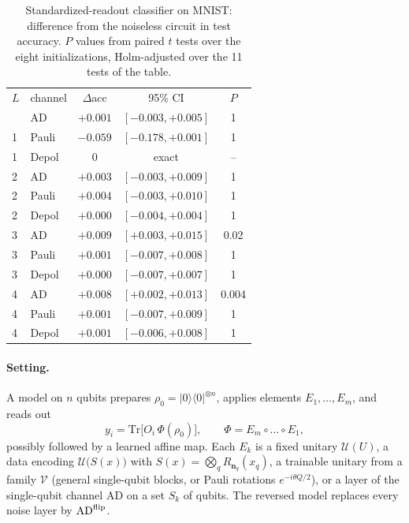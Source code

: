 \documentclass[
 aps,pra,
 twocolumn,
 superscriptaddress,
 longbibliography,
 nofootinbib
]{revtex4-2}
\newcommand{\Tr}{\mathrm{Tr}}
\providecommand{\ket}[1]{\lvert #1 \rangle}
\providecommand{\bra}[1]{\langle #1 \rvert}
\newcommand{\AD}{\mathrm{AD}}
\begin{document}
\begin{table}[t]
\caption{Standardized-readout classifier on MNIST: difference from the
noiseless circuit in test accuracy. $P$ values from paired $t$ tests over the
eight initializations, Holm-adjusted over the 11 tests of the table.}
\label{tab:stats}
\begin{ruledtabular}
\begin{tabular}{llccc}
$L$ & channel & $\Delta$acc & 95\% CI & $P$\\
\colrule
1 & AD & $+0.001$ & $[-0.003,+0.005]$ & 1\\
1 & Pauli & $-0.059$ & $[-0.178,+0.001]$ & 1\\
1 & Depol & $0$ & exact & --\\
2 & AD & $+0.003$ & $[-0.003,+0.009]$ & 1\\
2 & Pauli & $+0.004$ & $[-0.003,+0.010]$ & 1\\
2 & Depol & $+0.000$ & $[-0.004,+0.004]$ & 1\\
3 & AD & $+0.009$ & $[+0.003,+0.015]$ & 0.02\\
3 & Pauli & $+0.001$ & $[-0.007,+0.008]$ & 1\\
3 & Depol & $+0.000$ & $[-0.007,+0.007]$ & 1\\
4 & AD & $+0.008$ & $[+0.002,+0.013]$ & 0.004\\
4 & Pauli & $+0.001$ & $[-0.007,+0.009]$ & 1\\
4 & Depol & $+0.001$ & $[-0.006,+0.008]$ & 1\\
\end{tabular}
\end{ruledtabular}
\end{table}

\paragraph{Setting.}
A model on $n$ qubits prepares $\rho_0=\ket{0}\bra{0}^{\otimes n}$, applies elements
$E_1,\dots,E_m$, and reads out
\begin{equation}
y_i=\Tr\bigl[O_i\,\Phi(\rho_0)\bigr],\qquad \Phi=E_m\circ\dots\circ E_1 ,
\label{eq:app_model}
\end{equation}
possibly followed by a learned affine map. Each $E_k$ is a fixed unitary $\mathcal U(U)$, a data encoding
$\mathcal U\bigl(S(x)\bigr)$ with $S(x)=\bigotimes_q R_{\mathbf n_q}(x_q)$, a trainable unitary from a
family $\mathcal V$ (general single-qubit blocks, or Pauli rotations $e^{-i\theta Q/2}$), or a
layer of the single-qubit channel $\AD$ on a set $S_k$ of qubits. The reversed model
replaces every noise layer by $\AD^{\rm flip}$.
\end{document}
